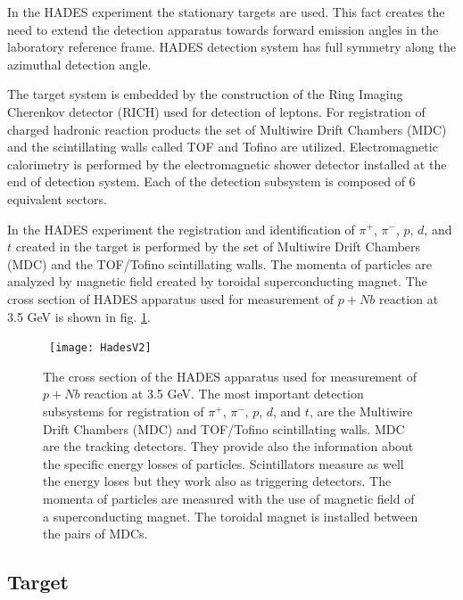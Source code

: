 In the HADES experiment the stationary targets are used. 
This fact creates the need to extend the detection apparatus towards forward emission 
angles in the laboratory reference frame. 
HADES detection system has full symmetry along the azimuthal detection angle. 

The target system is embedded by the construction of the Ring Imaging Cherenkov detector (RICH) 
used for detection of leptons.
For registration of charged hadronic reaction products the set of Multiwire Drift Chambers (MDC) 
and the scintillating walls called TOF and Tofino are utilized. Electromagnetic calorimetry 
is performed by the electromagnetic shower detector installed at the end of detection system.
Each of the detection subsystem is composed of 6 equivalent sectors. 


In the HADES experiment the registration and identification of $\pi^+$, $\pi^-$, $p$, $d$, and $t$ created in the target  
is performed by the set of Multiwire Drift Chambers (MDC) and the TOF/Tofino scintillating walls.
The momenta of particles are analyzed by magnetic field created by toroidal superconducting magnet.
The cross section of HADES apparatus used for measurement of $p+Nb$ reaction at 3.5 GeV 
is shown in fig. \ref{HadesV2}.

\begin{figure}
	\centering\
	\texttt{[image: HadesV2]}
	\caption{The cross section of the HADES apparatus used for  
measurement of $p+Nb$ reaction at 3.5 GeV. The most important 
detection subsystems for registration of $\pi^+$, $\pi^-$, $p$, $d$, and $t$, 
are the Multiwire Drift Chambers (MDC) and TOF/Tofino scintillating walls. 
MDC are the tracking detectors. They provide also the information about the specific 
energy losses of particles. Scintillators measure as well the energy loses 
but they work also as triggering detectors.
The momenta of particles are measured with the use of magnetic field 
of a superconducting magnet. The toroidal magnet is installed between the pairs of MDCs.}
\label{HadesV2}
\end{figure} 


\subsection{Target}

